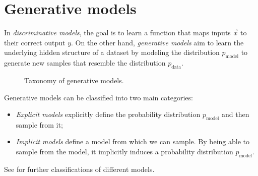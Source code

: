 \section{Generative models}

In \textit{discriminative models}, the goal is to learn a function that maps inputs $\vec{x}$ to
their correct output $y$. On the other hand, \textit{generative models} aim to learn the underlying
hidden structure of a dataset by modeling the distribution $p_{\mathrm{model}}$ to generate new
samples that resemble the distribution $p_{\mathrm{data}}$.

\begin{figure}
    \centering
    \caption{Taxonomy of generative models.}
    \label{fig:taxonomy}
\end{figure}

Generative models can be classified into two main categories:
\begin{itemize}
    \item \textit{Explicit models} explicitly define the probability distribution
          $p_{\mathrm{model}}$ and then sample from it;
    \item \textit{Implicit models} define a model from which we can sample. By being able to sample
          from the model, it implicitly induces a probability distribution $p_{\mathrm{model}}$.
\end{itemize}
See  for further classifications of different models.

